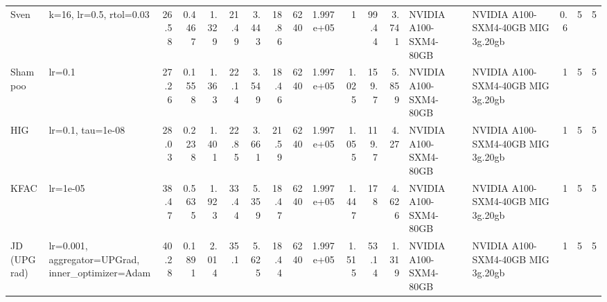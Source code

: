 \begin{tabular}{llrrrrrrrrrrrllrrr}
Sven & k=16, lr=0.5, rtol=0.03 & 26.58 & 0.4467 & 1.329 & 21.49 & 3.443 & 18.86 & 6240 & 1.997e+05 & 1 & 99.44 & 3.741 & NVIDIA A100-SXM4-80GB & NVIDIA A100-SXM4-40GB MIG 3g.20gb & 0.6 & 5 & 5 \\
Shampoo & lr=0.1 & 27.26 & 0.1558 & 1.363 & 22.14 & 3.549 & 18.46 & 6240 & 1.997e+05 & 1.025 & 159.7 & 5.859 & NVIDIA A100-SXM4-80GB & NVIDIA A100-SXM4-40GB MIG 3g.20gb & 1 & 5 & 5 \\
HIG & lr=0.1, tau=1e-08 & 28.03 & 0.2238 & 1.401 & 22.85 & 3.661 & 21.59 & 6240 & 1.997e+05 & 1.055 & 119.7 & 4.27 & NVIDIA A100-SXM4-80GB & NVIDIA A100-SXM4-40GB MIG 3g.20gb & 1 & 5 & 5 \\
KFAC & lr=1e-05 & 38.47 & 0.5635 & 1.923 & 33.44 & 5.359 & 18.47 & 6240 & 1.997e+05 & 1.447 & 178 & 4.626 & NVIDIA A100-SXM4-80GB & NVIDIA A100-SXM4-40GB MIG 3g.20gb & 1 & 5 & 5 \\
JD (UPGrad) & lr=0.001, aggregator=UPGrad, inner\_optimizer=Adam & 40.28 & 0.1891 & 2.014 & 35.1 & 5.625 & 18.44 & 6240 & 1.997e+05 & 1.515 & 53.14 & 1.319 & NVIDIA A100-SXM4-80GB & NVIDIA A100-SXM4-40GB MIG 3g.20gb & 1 & 5 & 5 \\
\bottomrule
\end{tabular}
